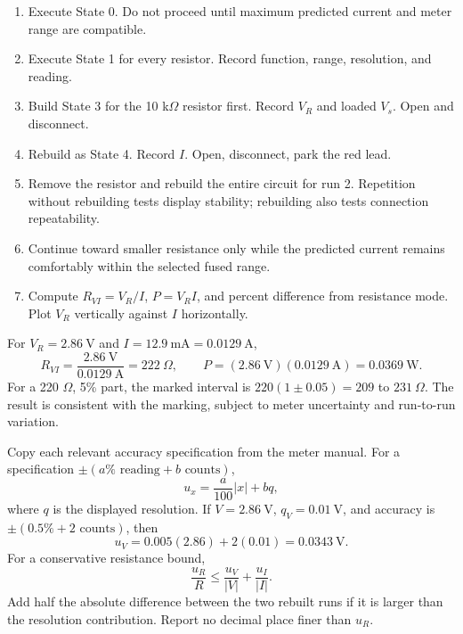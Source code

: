 \begin{enumerate}
\item Execute State 0. Do not proceed until maximum predicted current and
meter range are compatible.
\item Execute State 1 for every resistor. Record function, range, resolution,
and reading.
\item Build State 3 for the 10 k\(\Omega\) resistor first. Record \(V_R\) and
loaded \(V_s\). Open and disconnect.
\item Rebuild as State 4. Record \(I\). Open, disconnect, park the red lead.
\item Remove the resistor and rebuild the entire circuit for run 2. Repetition
without rebuilding tests display stability; rebuilding also tests connection
repeatability.
\item Continue toward smaller resistance only while the predicted current
remains comfortably within the selected fused range.
\item Compute \(R_{VI}=V_R/I\), \(P=V_RI\), and percent difference from
resistance mode. Plot \(V_R\) vertically against \(I\) horizontally.
\end{enumerate}

For \(V_R=2.86\ \mathrm{V}\) and \(I=12.9\ \mathrm{mA}
=0.0129\ \mathrm{A}\),
\[
R_{VI}=\frac{2.86\ \mathrm{V}}{0.0129\ \mathrm{A}}
=222\ \Omega,\qquad
P=(2.86\ \mathrm{V})(0.0129\ \mathrm{A})=0.0369\ \mathrm{W}.
\]
For a 220 \(\Omega\), 5\% part, the marked interval is
\(220(1\pm0.05)=209\) to \(231\ \Omega\). The result is consistent with the
marking, subject to meter uncertainty and run-to-run variation.

Copy each relevant accuracy specification from the meter manual. For a
specification \(\pm(a\%\text{ reading}+b\text{ counts})\),
\[
u_x=\frac{a}{100}|x|+bq,
\]
where \(q\) is the displayed resolution. If \(V=2.86\ \mathrm{V}\), \(q_V=0.01\
\mathrm{V}\), and accuracy is \(\pm(0.5\%+2\text{ counts})\), then
\[
u_V=0.005(2.86)+2(0.01)=0.0343\ \mathrm{V}.
\]
For a conservative resistance bound,
\[
\frac{u_R}{R}\leq\frac{u_V}{|V|}+\frac{u_I}{|I|}.
\]
Add half the absolute difference between the two rebuilt runs if it is larger
than the resolution contribution. Report no decimal place finer than \(u_R\).

